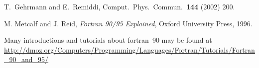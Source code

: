 \documentclass[12pt]{article}
\begin{document}
\begin{thebibliography}{99}
  T.~Gehrmann and E.~Remiddi,
  Comput.\ Phys.\ Commun.\  {\bf 144} (2002) 200.

  M. Metcalf and J. Reid, \emph{Fortran 90/95 Explained}, Oxford
  University Press, 1996.

 Many introductions and tutorials about
  fortran~90 may be found at
  \url{http://dmoz.org/Computers/Programming/Languages/Fortran/Tutorials/Fortran_90_and_95/}

\end{thebibliography}





\end{document}
